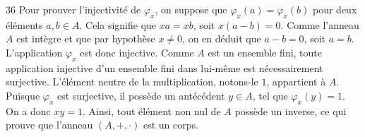 \begin{correction}{36}
Pour prouver l'injectivité de $\varphi_x$, on suppose que $\varphi_x(a) = \varphi_x(b)$ pour deux éléments $a,b \in A$.
Cela signifie que $xa = xb$, soit $x(a-b) = 0$.
Comme l'anneau $A$ est intègre et que par hypothèse $x \neq 0$, on en déduit que $a-b=0$, soit $a=b$. L'application $\varphi_x$ est donc injective.
Comme $A$ est un ensemble fini, toute application injective d'un ensemble fini dans lui-même est nécessairement surjective.
L'élément neutre de la multiplication, notons-le $1$, appartient à $A$. Puisque $\varphi_x$ est surjective, il possède un antécédent $y \in A$, tel que $\varphi_x(y) = 1$.
On a donc $xy = 1$.
Ainsi, tout élément non nul de $A$ possède un inverse, ce qui prouve que l'anneau $(A, +, \cdot)$ est un corps.
\end{correction}
